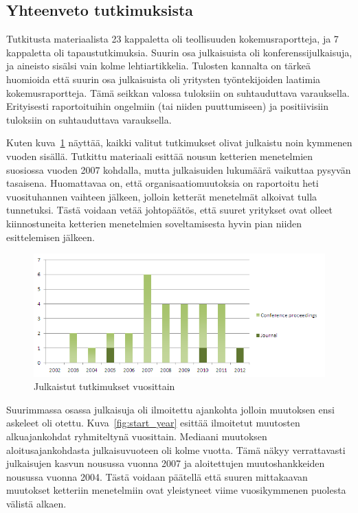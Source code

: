 \subsection{Yhteenveto tutkimuksista}

Tutkitusta materiaalista 23 kappaletta oli teollisuuden kokemusraportteja, ja 7
kappaletta oli tapaustutkimuksia. Suurin osa julkaisuista oli
konferenssijulkaisuja, ja aineisto sisälsi vain kolme lehtiartikkelia. Tulosten
kannalta on tärkeä huomioida että suurin osa julkaisuista oli yritysten
työntekijoiden laatimia kokemusraportteja. Tämä seikkan valossa tuloksiin on
suhtauduttava varauksella. Erityisesti raportoituihin ongelmiin (tai niiden
puuttumiseen) ja positiivisiin tuloksiin on suhtauduttava varauksella.

Kuten kuva~\ref{fig:publications} näyttää, kaikki valitut tutkimukset olivat
julkaistu noin kymmenen vuoden sisällä. Tutkittu materiaali esittää nousun
ketterien menetelmien suosiossa vuoden 2007 kohdalla, mutta julkaisuiden
lukumäärä vaikuttaa pysyvän tasaisena. Huomattavaa on, että
organisaatiomuutoksia on raportoitu heti vuosituhannen vaihteen jälkeen, jolloin
ketterät menetelmät alkoivat tulla tunnetuksi. Tästä voidaan vetää johtopäätös,
että suuret yritykset ovat olleet kiinnostuneita ketterien menetelmien
soveltamisesta hyvin pian niiden esittelemisen jälkeen.

\begin{figure}[htb]
  \begin{center}
    \includegraphics[width=1\textwidth]{img/Publications}
    \caption{Julkaistut tutkimukset vuosittain}
    \label{fig:publications}
  \end{center}
\end{figure}

Suurimmassa osassa julkaisuja oli ilmoitettu ajankohta jolloin muutoksen ensi
askeleet oli otettu. Kuva~\ref{fig:start_year} esittää ilmoitetut muutosten
alkuajankohdat ryhmiteltynä vuosittain. Mediaani muutoksen aloitusajankohdasta
julkaisuvuoteen oli kolme vuotta. Tämä näkyy verrattavasti julkaisujen kasvun
nousussa vuonna 2007 ja aloitettujen muutoshankkeiden nousussa vuonna 2004.
Tästä voidaan päätellä että suuren mittakaavan muutokset ketteriin menetelmiin
ovat yleistyneet viime vuosikymmenen puolesta välistä alkaen. 


